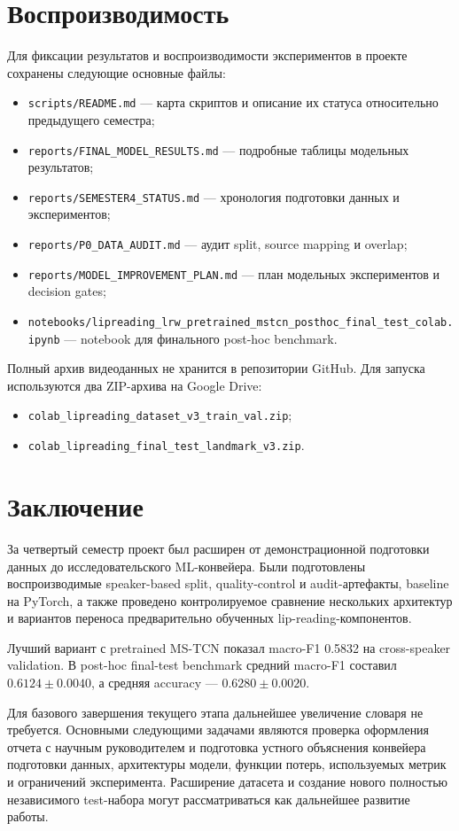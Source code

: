 \documentclass[12pt,a4paper]{article}
\begin{document}
\section{Воспроизводимость}

Для фиксации результатов и воспроизводимости экспериментов в проекте
сохранены следующие основные файлы:

\begin{itemize}
\item \texttt{scripts/README.md} --- карта скриптов и описание их статуса
      относительно предыдущего семестра;
\item \texttt{reports/FINAL\_MODEL\_RESULTS.md} --- подробные таблицы
      модельных результатов;
\item \texttt{reports/SEMESTER4\_STATUS.md} --- хронология подготовки
      данных и экспериментов;
\item \texttt{reports/P0\_DATA\_AUDIT.md} --- аудит split, source mapping
      и overlap;
\item \texttt{reports/MODEL\_IMPROVEMENT\_PLAN.md} --- план модельных
      экспериментов и decision gates;
\item \texttt{notebooks/lipreading\_lrw\_pretrained\_mstcn\_posthoc\_final\_test\_colab.ipynb}
      --- notebook для финального post-hoc benchmark.
\end{itemize}

Полный архив видеоданных не хранится в репозитории GitHub. Для запуска
используются два ZIP-архива на Google Drive:

\begin{itemize}
\item \texttt{colab\_lipreading\_dataset\_v3\_train\_val.zip};
\item \texttt{colab\_lipreading\_final\_test\_landmark\_v3.zip}.
\end{itemize}

\section{Заключение}

За четвертый семестр проект был расширен от демонстрационной подготовки
данных до исследовательского ML-конвейера. Были подготовлены воспроизводимые
speaker-based split, quality-control и audit-артефакты, baseline на PyTorch,
а также проведено контролируемое сравнение нескольких архитектур и вариантов
переноса предварительно обученных lip-reading-компонентов.

Лучший вариант с pretrained MS-TCN показал macro-F1 0.5832 на
cross-speaker validation. В post-hoc final-test benchmark средний macro-F1
составил $0.6124 \pm 0.0040$, а средняя accuracy ---
$0.6280 \pm 0.0020$.

Для базового завершения текущего этапа дальнейшее увеличение словаря не
требуется. Основными следующими задачами являются проверка оформления
отчета с научным руководителем и подготовка устного объяснения конвейера
подготовки данных, архитектуры модели, функции потерь, используемых метрик
и ограничений эксперимента. Расширение датасета и создание нового полностью
независимого test-набора могут рассматриваться как дальнейшее развитие работы.
\end{document}
